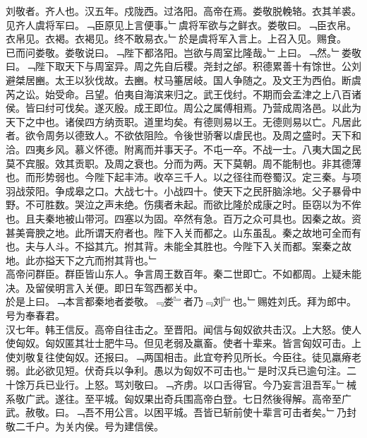\documentclass{zhvt-classic}
\begin{document}

\hspace*{2em}刘敬者。齐人也。汉五年。戍陇西。过洛阳。高帝在焉。娄敬脱輓辂。衣其羊裘。见齐人虞将军曰。﹁臣原见上言便事。﹂虞将军欲与之鲜衣。娄敬曰。﹁臣衣帛。衣帛见。衣褐。衣褐见。终不敢易衣。﹂於是虞将军入言上。上召入见。赐食。\\
\hspace*{2em}已而问娄敬。娄敬说曰。﹁陛下都洛阳。岂欲与周室比隆哉。﹂上曰。﹁然。﹂娄敬曰。﹁陛下取天下与周室异。周之先自后稷。尧封之邰。积德累善十有馀世。公刘避桀居豳。太王以狄伐故。去豳。杖马箠居岐。国人争随之。及文王为西伯。断虞芮之讼。始受命。吕望。伯夷自海滨来归之。武王伐纣。不期而会孟津之上八百诸侯。皆曰纣可伐矣。遂灭殷。成王即位。周公之属傅相焉。乃营成周洛邑。以此为天下之中也。诸侯四方纳贡职。道里均矣。有德则易以王。无德则易以亡。凡居此者。欲令周务以德致人。不欲依阻险。令後世骄奢以虐民也。及周之盛时。天下和洽。四夷乡风。慕义怀德。附离而并事天子。不屯一卒。不战一士。八夷大国之民莫不宾服。效其贡职。及周之衰也。分而为两。天下莫朝。周不能制也。非其德薄也。而形势弱也。今陛下起丰沛。收卒三千人。以之径往而卷蜀汉。定三秦。与项羽战荥阳。争成皋之口。大战七十。小战四十。使天下之民肝脑涂地。父子暴骨中野。不可胜数。哭泣之声未绝。伤痍者未起。而欲比隆於成康之时。臣窃以为不侔也。且夫秦地被山带河。四塞以为固。卒然有急。百万之众可具也。因秦之故。资甚美膏腴之地。此所谓天府者也。陛下入关而都之。山东虽乱。秦之故地可全而有也。夫与人斗。不搤其亢。拊其背。未能全其胜也。今陛下入关而都。案秦之故地。此亦搤天下之亢而拊其背也。﹂\\
\hspace*{2em}高帝问群臣。群臣皆山东人。争言周王数百年。秦二世即亡。不如都周。上疑未能决。及留侯明言入关便。即日车驾西都关中。\\
\hspace*{2em}於是上曰。﹁本言都秦地者娄敬。﹃娄﹄者乃﹃刘﹄也。﹂赐姓刘氏。拜为郎中。号为奉春君。\\
\hspace*{2em}汉七年。韩王信反。高帝自往击之。至晋阳。闻信与匈奴欲共击汉。上大怒。使人使匈奴。匈奴匿其壮士肥牛马。但见老弱及羸畜。使者十辈来。皆言匈奴可击。上使刘敬复往使匈奴。还报曰。﹁两国相击。此宜夸矜见所长。今臣往。徒见羸瘠老弱。此必欲见短。伏奇兵以争利。愚以为匈奴不可击也。﹂是时汉兵已逾句注。二十馀万兵已业行。上怒。骂刘敬曰。﹁齐虏。以口舌得官。今乃妄言沮吾军。﹂械系敬广武。遂往。至平城。匈奴果出奇兵围高帝白登。七日然後得解。高帝至广武。赦敬。曰。﹁吾不用公言。以困平城。吾皆已斩前使十辈言可击者矣。﹂乃封敬二千户。为关内侯。号为建信侯。\\
\end{document}
